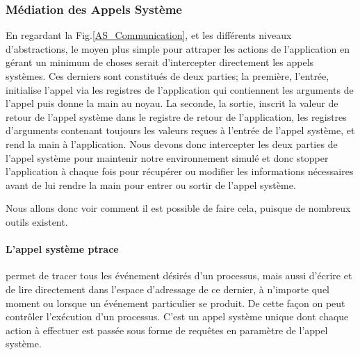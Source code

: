     

\subsubsection{Médiation des Appels Système}

En regardant la Fig.\ref{AS_Communication}, et les différents niveaux
d'abstractions, le moyen plus simple pour attraper les actions de l'application
en gérant un minimum de choses serait d'intercepter directement les appels
systèmes.  Ces derniers sont constitués de deux parties; la première, l'entrée,
initialise l'appel via les registres de l'application qui contiennent les
arguments de l'appel puis donne la main au noyau. La seconde, la sortie, inscrit
la valeur de retour de l'appel système dans le registre de retour de
l'application, les registres d'arguments contenant toujours les valeurs reçues à
l'entrée de l'appel système, et rend la main à l'application. Nous devons donc
intercepter les deux parties de l'appel système pour maintenir notre
environnement simulé et donc stopper l'application à chaque fois pour récupérer
ou modifier les informations nécessaires avant de lui rendre la main pour entrer
ou sortir de l'appel système.

 Nous allons donc voir comment il est possible de faire cela, puisque de
 nombreux outils existent.
 
 \paragraph{L'appel système ptrace}\cite{INTERCEPTION:AS, INTERCEPTION:MARION}
 permet de tracer tous les événement désirés d'un processus, mais aussi d'écrire
 et de lire directement dans l'espace d'adressage de ce dernier, à n'importe
 quel moment ou lorsque un événement particulier se produit. De cette façon on
 peut contrôler l'exécution d'un processus. C'est un appel système unique dont
 chaque action à effectuer est passée sous forme de requêtes en paramètre de
 l'appel système.

